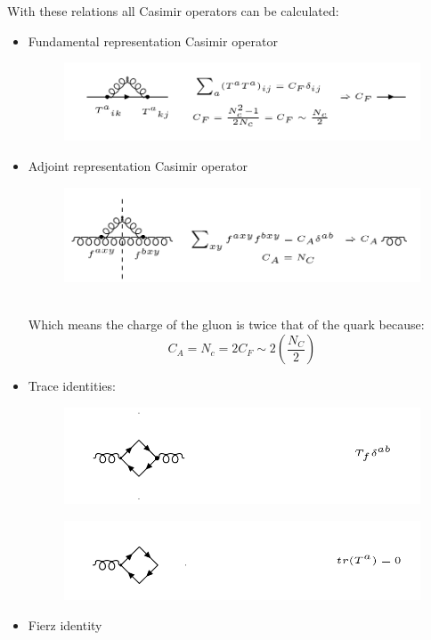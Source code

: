 With these relations all Casimir operators can be calculated:\\
\begin{itemize}
\item Fundamental representation Casimir operator\\
\begin{figure}[h!]
\centering
\includegraphics[scale=0.6]{images/Intro/Casimir1.png}
\end{figure}
\item Adjoint representation Casimir operator\\
\begin{figure}[h!]
\centering
\includegraphics[scale=0.6]{images/Intro/Casimir2.png}
\end{figure}
\pagebreak
\\

Which means the charge of the gluon is twice that of the quark because:
\begin{equation}
 C_A = N_c =2C_F \sim 2(\frac{N_C}{2}) 
\end{equation}
\item Trace identities:\\
\begin{figure}[h!]
\centering
\includegraphics[scale=0.6]{images/Intro/Casimir3.png}
\end{figure}
\begin{figure}[h!]
\centering
\includegraphics[scale=0.6]{images/Intro/Casimir4.png}
\end{figure}

\item Fierz identity
\end{itemize}
